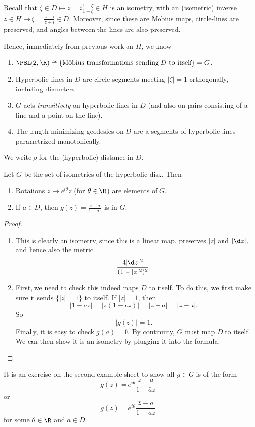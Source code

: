 \documentclass[a4paper]{article}
\begin{document}
Recall that $\zeta \in D \mapsto z = i\frac{1 + \zeta}{1 - \zeta} \in H$ is an isometry, with an (isometric) inverse $z \in H \mapsto \zeta = \frac{z - i}{z + i} \in D$. Moreover, since these are M\"obius maps, circle-lines are preserved, and angles between the lines are also preserved.

Hence, immediately from previous work on $H$, we know
\begin{enumerate}
  \item $\PSL(2, \R) \cong \{\text{M\"obius transformations sending $D$ to itself}\} = G$.
  \item Hyperbolic lines in $D$ are circle segments meeting $|\zeta| = 1$ orthogonally, including diameters.
  \item $G$ acts \emph{transitively} on hyperbolic lines in $D$ (and also on pairs consisting of a line and a point on the line).
  \item The length-minimizing geodesics on $D$ are a segments of hyperbolic lines parametrized monotonically.
\end{enumerate}

We write $\rho$ for the (hyperbolic) distance in $D$.

\begin{lemma}
  Let $G$ be the set of isometries of the hyperbolic disk. Then
  \begin{enumerate}
    \item Rotations $z \mapsto e^{i\theta}z$ (for $\theta \in \R$) are elements of $G$.
    \item If $a \in D$, then $g(z) = \frac{z - a}{1 - \bar{a} z}$ is in $G$.
  \end{enumerate}
\end{lemma}

\begin{proof}\leavevmode
  \begin{enumerate}
    \item This is clearly an isometry, since this is a linear map, preserves $|z|$ and $|\d z|$, and hence also the metric
      \[
        \frac{4 |\d z|^2}{(1 - |z|^2)^2}.
      \]
    \item First, we need to check this indeed maps $D$ to itself. To do this, we first make sure it sends $\{|z| = 1\}$ to itself. If $|z| = 1$, then
      \[
        |1 - \bar{a} z| = |\bar{z} (1 - \bar{a} z)| = |\bar{z} - \bar{a}| = |z - a|.
      \]
      So
      \[
        |g(z)| = 1.
      \]
      Finally, it is easy to check $g(a) = 0$. By continuity, $G$ must map $D$ to itself. We can then show it is an isometry by plugging it into the formula.\qedhere
  \end{enumerate}
\end{proof}
It is an exercise on the second example sheet to show all $g \in G$ is of the form
\[
  g(z) = e^{i\theta} \frac{z - a}{1 - \bar{a} z}
\]
or
\[
  g(z) = e^{i\theta} \frac{\bar{z} - a}{1 - \bar{a} \bar{z}}
\]
for some $\theta \in \R$ and $a \in D$.
\end{document}
